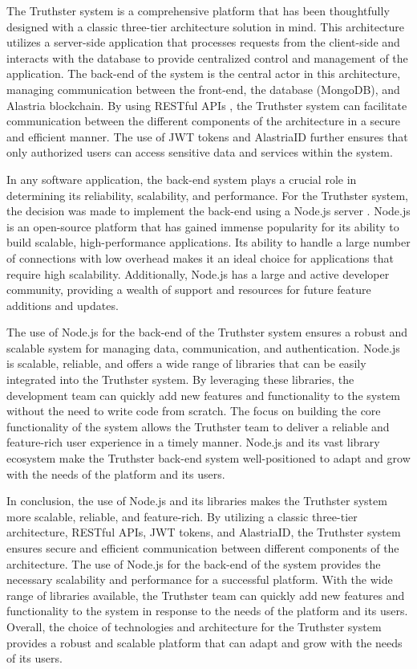 \documentclass[target=mst,aauheader=]{thud}
\begin{document}
The Truthster system is a comprehensive platform that has been thoughtfully designed with a classic three-tier architecture \cite{3tierArchitecture} solution in mind. This architecture utilizes a server-side application that processes requests from the client-side and interacts with the database to provide centralized control and management of the application. The back-end of the system is the central actor in this architecture, managing communication between the front-end, the database (MongoDB), and Alastria blockchain. By using RESTful APIs \cite{restAPI}, the Truthster system can facilitate communication between the different components of the architecture in a secure and efficient manner. The use of JWT tokens \cite{jwtTokens} and AlastriaID further ensures that only authorized users can access sensitive data and services within the system.

In any software application, the back-end system plays a crucial role in determining its reliability, scalability, and performance. For the Truthster system, the decision was made to implement the back-end using a Node.js server \cite{nodeJs}. Node.js is an open-source platform that has gained immense popularity for its ability to build scalable, high-performance applications. Its ability to handle a large number of connections with low overhead makes it an ideal choice for applications that require high scalability. Additionally, Node.js has a large and active developer community, providing a wealth of support and resources for future feature additions and updates.

The use of Node.js for the back-end of the Truthster system ensures a robust and scalable system for managing data, communication, and authentication. Node.js is scalable, reliable, and offers a wide range of libraries that can be easily integrated into the Truthster system. By leveraging these libraries, the development team can quickly add new features and functionality to the system without the need to write code from scratch. The focus on building the core functionality of the system allows the Truthster team to deliver a reliable and feature-rich user experience in a timely manner. Node.js and its vast library ecosystem make the Truthster back-end system well-positioned to adapt and grow with the needs of the platform and its users.

In conclusion, the use of Node.js and its libraries makes the Truthster system more scalable, reliable, and feature-rich. By utilizing a classic three-tier architecture, RESTful APIs, JWT tokens, and AlastriaID, the Truthster system ensures secure and efficient communication between different components of the architecture. The use of Node.js for the back-end of the system provides the necessary scalability and performance for a successful platform. With the wide range of libraries available, the Truthster team can quickly add new features and functionality to the system in response to the needs of the platform and its users. Overall, the choice of technologies and architecture for the Truthster system provides a robust and scalable platform that can adapt and grow with the needs of its users.
\end{document}
